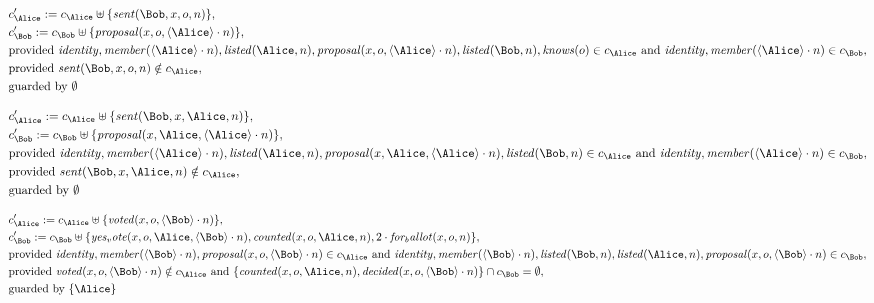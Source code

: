 \begin{align*}
&
c'_
{
\Alice
}
 := 
c_
{
\Alice
}
 \uplus 
\{
\mathit{
sent
}
(
\Bob
,
x
,
o
,
n
)
\}
,\\
&
c'_
{
\Bob
}
 := 
c_
{
\Bob
}
 \uplus 
\{
\mathit{
proposal
}
(
x
,
o
,
\langle
\Alice
\rangle
\cdot
n
)
\}
,\\
&
\text{provided } 
\mathit{
identity
}
,
\mathit{
member
}
(
\langle
\Alice
\rangle
\cdot
n
)
,
\mathit{
listed
}
(
\Alice
,
n
)
,
\mathit{
proposal
}
(
x
,
o
,
\langle
\Alice
\rangle
\cdot
n
)
,
\mathit{
listed
}
(
\Bob
,
n
)
,
\mathit{
knows
}
(
o
)
 \in c_
{
\Alice
}
 \text{ and } 
\mathit{
identity
}
,
\mathit{
member
}
(
\langle
\Alice
\rangle
\cdot
n
)
 \in c_
{
\Bob
}
,\\
&
\text{provided } 
\mathit{
sent
}
(
\Bob
,
x
,
o
,
n
)
 \notin c_
{
\Alice
}
,\\
&
\text{guarded by } \emptyset
\end{align*}

\begin{align*}
&
c'_
{
\Alice
}
 := 
c_
{
\Alice
}
 \uplus 
\{
\mathit{
sent
}
(
\Bob
,
x
,
\Alice
,
n
)
\}
,\\
&
c'_
{
\Bob
}
 := 
c_
{
\Bob
}
 \uplus 
\{
\mathit{
proposal
}
(
x
,
\Alice
,
\langle
\Alice
\rangle
\cdot
n
)
\}
,\\
&
\text{provided } 
\mathit{
identity
}
,
\mathit{
member
}
(
\langle
\Alice
\rangle
\cdot
n
)
,
\mathit{
listed
}
(
\Alice
,
n
)
,
\mathit{
proposal
}
(
x
,
\Alice
,
\langle
\Alice
\rangle
\cdot
n
)
,
\mathit{
listed
}
(
\Bob
,
n
)
 \in c_
{
\Alice
}
 \text{ and } 
\mathit{
identity
}
,
\mathit{
member
}
(
\langle
\Alice
\rangle
\cdot
n
)
 \in c_
{
\Bob
}
,\\
&
\text{provided } 
\mathit{
sent
}
(
\Bob
,
x
,
\Alice
,
n
)
 \notin c_
{
\Alice
}
,\\
&
\text{guarded by } \emptyset
\end{align*}

\begin{align*}
&
c'_
{
\Alice
}
 := 
c_
{
\Alice
}
 \uplus 
\{
\mathit{
voted
}
(
x
,
o
,
\langle
\Bob
\rangle
\cdot
n
)
\}
,\\
&
c'_
{
\Bob
}
 := 
c_
{
\Bob
}
 \uplus 
\{
\mathit{
yes_vote
}
(
x
,
o
,
\Alice
,
\langle
\Bob
\rangle
\cdot
n
)
,
\mathit{
counted
}
(
x
,
o
,
\Alice
,
n
)
,
2
\cdot
\mathit{
for_ballot
}
(
x
,
o
,
n
)
\}
,\\
&
\text{provided } 
\mathit{
identity
}
,
\mathit{
member
}
(
\langle
\Bob
\rangle
\cdot
n
)
,
\mathit{
proposal
}
(
x
,
o
,
\langle
\Bob
\rangle
\cdot
n
)
 \in c_
{
\Alice
}
 \text{ and } 
\mathit{
identity
}
,
\mathit{
member
}
(
\langle
\Bob
\rangle
\cdot
n
)
,
\mathit{
listed
}
(
\Bob
,
n
)
,
\mathit{
listed
}
(
\Alice
,
n
)
,
\mathit{
proposal
}
(
x
,
o
,
\langle
\Bob
\rangle
\cdot
n
)
 \in c_
{
\Bob
}
,\\
&
\text{provided } 
\mathit{
voted
}
(
x
,
o
,
\langle
\Bob
\rangle
\cdot
n
)
 \notin c_
{
\Alice
}
 \text{ and } 
\{
\mathit{
counted
}
(
x
,
o
,
\Alice
,
n
)
,
\mathit{
decided
}
(
x
,
o
,
\langle
\Bob
\rangle
\cdot
n
)
\}
 \cap c_
{
\Bob
}
 = \emptyset
,\\
&
\text{guarded by } \{
\Alice
\}
\end{align*}
